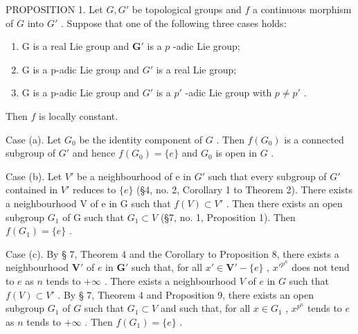 PROPOSITION 1. Let \(G, G'\) be topological groups and \(f\) a continuous morphism of \(G\) into \(G'\) . Suppose that one of the following three cases holds:

\begin{enumerate}
\def\labelenumi{(\alph{enumi})}
\item
  G is a real Lie group and \(\mathbf{G}'\) is a \(p\) -adic Lie group;
\item
  G is a p-adic Lie group and \(G'\) is a real Lie group;
\item
  G is a p-adic Lie group and \(G'\) is a \(p'\) -adic Lie group with \(p \neq p'\) .
\end{enumerate}

Then \(f\) is locally constant.

Case (a). Let \(G_0\) be the identity component of \(G\) . Then \(f(G_0)\) is a connected subgroup of \(G'\) and hence \(f(G_0) = \{e\}\) and \(G_0\) is open in \(G\) .

Case (b). Let \(V'\) be a neighbourhood of e in \(G'\) such that every subgroup of \(G'\) contained in \(V'\) reduces to \(\{e\}\) (§4, no. 2, Corollary 1 to Theorem 2). There exists a neighbourhood V of e in G such that \(f(V) \subset V'\) . Then there exists an open subgroup \(G_{1}\) of G such that \(G_{1} \subset V\) (§7, no. 1, Proposition 1). Then \(f(G_{1}) = \{e\}\) .

Case (c). By § 7, Theorem 4 and the Corollary to Proposition 8, there exists a neighbourhood \(\mathbf{V}'\) of \(e\) in \(\mathbf{G}'\) such that, for all \(x' \in \mathbf{V}' - \{e\}\) , \(x'^{p^n}\) does not tend to \(e\) as \(n\) tends to \(+\infty\) . There exists a neighbourhood \(V\) of \(e\) in \(G\) such that \(f(V) \subset V'\) . By § 7, Theorem 4 and Proposition 9, there exists an open subgroup \(G_1\) of \(G\) such that \(G_1 \subset V\) and such that, for all \(x \in G_1\) , \(x^{p^n}\) tends to \(e\) as \(n\) tends to \(+\infty\) . Then \(f(G_1) = \{e\}\) .

